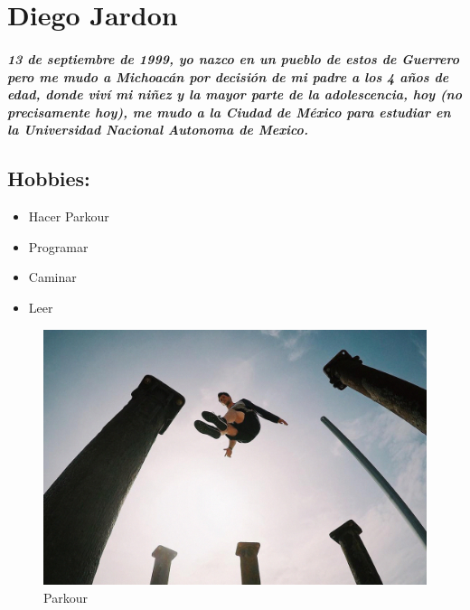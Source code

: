 \chapter{Diego Jardon}
\paragraph{
  13 de septiembre de 1999, yo nazco en un pueblo de estos de Guerrero pero me mudo a Michoacán por decisión de mi padre a los 4 años de edad, donde viví mi niñez y la mayor parte de la adolescencia, hoy (no precisamente hoy), me mudo a la Ciudad de México para estudiar en la Universidad Nacional Autonoma de Mexico.
}

\section{Hobbies:}

\begin{itemize}
    \item{Hacer Parkour}
    \item{Programar}
    \item{Caminar}
    \item{Leer \cite{cita}}
\end{itemize}

\begin{figure}[h]
  \centering
  \includegraphics[scale=0.15]{IMG/1.jpg}
  \caption{Parkour}
\end{figure}